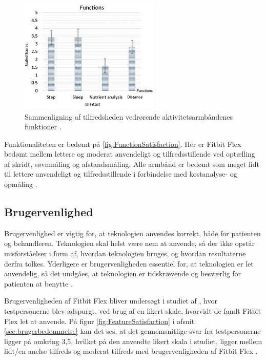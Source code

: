 \begin{figure}[H]
	\centering
	\includegraphics[width=0.6\textwidth]{figures/FunctionSatisfaction2}
	\caption{Sammenligning af tilfredsheden vedrørende aktivitetsarmbåndenes funktioner \citep{kaewkannate2016}.}
	\label{fig:FunctionSatisfaction}
\end{figure}

\noindent
Funktionaliteten er bedømt på \autoref{fig:FunctionSatisfaction}. Her er Fitbit Flex bedømt mellem lettere og moderat anvendeligt og tilfredsstillende ved optælling af skridt, søvnmåling og afstandsmåling. Alle armbånd er bedømt som meget lidt til lettere anvendeligt og tilfredsstillende i forbindelse med kostanalyse- og opmåling \citep{kaewkannate2016}.

\subsection{Brugervenlighed}

Brugervenlighed er vigtig for, at teknologien anvendes korrekt, både for patienten og behandleren. Teknologien skal helst være nem at anvende, så der ikke opstår misforståelser i form af, hvordan teknologien bruges, og hvordan resultaterne derfra tolkes. Yderligere er brugervenligheden essentiel for, at teknologien er let anvendelig, så det undgåes, at teknologien er tidskrævende og besværlig for patienten at benytte \citep{Nordgren2013}. 

Brugervenligheden af Fitbit Flex bliver undersøgt i studiet af \citeauthor{kaewkannate2016}, hvor testpersonerne blev adspurgt, ved brug af en likert skale, hvorvidt de fandt Fitbit Flex let at anvende. På figur \autoref{fig:FeatureSatisfaction} i afsnit \autoref{sec:brugerbedommelse} kan det ses, at det gennemsnitlige svar fra testpersonerne ligger på omkring 3,5, hvilket på den anvendte likert skala i studiet, ligger mellem lidt/en anelse tilfreds og moderat tilfreds med brugervenligheden af Fitbit Flex \citep{kaewkannate2016}.

